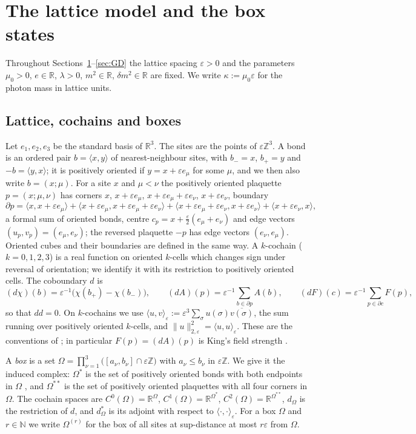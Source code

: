 \documentclass[11pt]{amsart}
\theoremstyle{plain}
\theoremstyle{definition}
\theoremstyle{remark}
\numberwithin{equation}{section}
\newcommand{\R}{\mathbb{R}}
\newcommand{\Z}{\mathbb{Z}}
\newcommand{\N}{\mathbb{N}}
\newcommand{\eps}{\varepsilon}
\newcommand{\norm}[1]{\lVert #1\rVert}
\newcommand{\ip}[2]{\langle #1,#2\rangle}
\newcommand{\ev}[1]{\langle #1\rangle}
\begin{document}
\section{The lattice model and the box states}\label{sec:model}

Throughout Sections~\ref{sec:model}--\ref{sec:GD} the lattice spacing $\eps>0$ and the parameters $\mu_0>0$, $e\in\R$, $\lambda>0$, $m^2\in\R$, $\delta m^2\in\R$ are fixed. We write $\kappa:=\mu_0\eps$ for the photon mass in lattice units.

\subsection{Lattice, cochains and boxes}\label{ssec:lattice}
Let $e_1,e_2,e_3$ be the standard basis of $\R^3$. The sites are the points of $\eps\Z^3$. A bond is an ordered pair $b=\ev{x,y}$ of nearest-neighbour sites, with $b_-=x$, $b_+=y$ and $-b=\ev{y,x}$; it is positively oriented if $y=x+\eps e_\mu$ for some $\mu$, and we then also write $b=(x;\mu)$. For a site $x$ and $\mu<\nu$ the positively oriented plaquette $p=(x;\mu,\nu)$ has corners $x$, $x+\eps e_\mu$, $x+\eps e_\mu+\eps e_\nu$, $x+\eps e_\nu$, boundary
\[
\partial p=\ev{x,x+\eps e_\mu}+\ev{x+\eps e_\mu,x+\eps e_\mu+\eps e_\nu}+\ev{x+\eps e_\mu+\eps e_\nu,x+\eps e_\nu}+\ev{x+\eps e_\nu,x},
\]
a formal sum of oriented bonds, centre $c_p=x+\frac\eps2(e_\mu+e_\nu)$ and edge vectors $(u_p,v_p)=(e_\mu,e_\nu)$; the reversed plaquette $-p$ has edge vectors $(e_\nu,e_\mu)$. Oriented cubes and their boundaries are defined in the same way. A $k$-cochain ($k=0,1,2,3$) is a real function on oriented $k$-cells which changes sign under reversal of orientation; we identify it with its restriction to positively oriented cells. The coboundary $d$ is
\[
(d\chi)(b)=\eps^{-1}\big(\chi(b_+)-\chi(b_-)\big),\qquad (dA)(p)=\eps^{-1}\sum_{b\in\partial p}A(b),\qquad (dF)(c)=\eps^{-1}\sum_{p\in\partial c}F(p),
\]
so that $dd=0$. On $k$-cochains we use $\ip uv_\eps:=\eps^3\sum_\sigma u(\sigma)\overline{v(\sigma)}$, the sum running over positively oriented $k$-cells, and $\norm u_{2,\eps}^2=\ip uu_\eps$. These are the conventions of \cite{K1,K2}; in particular $F(p)=(dA)(p)$ is King's field strength \cite[(2.11)]{K2}.

A \emph{box} is a set $\Omega=\prod_{\nu=1}^3\big([a_\nu,b_\nu]\cap\eps\Z\big)$ with $a_\nu\le b_\nu$ in $\eps\Z$. We give it the induced complex: $\Omega^*$ is the set of positively oriented bonds with both endpoints in $\Omega$ \cite[p.~651]{K1}, and $\Omega^{**}$ is the set of positively oriented plaquettes with all four corners in $\Omega$. The cochain spaces are $C^0(\Omega)=\R^\Omega$, $C^1(\Omega)=\R^{\Omega^*}$, $C^2(\Omega)=\R^{\Omega^{**}}$, $d_\Omega$ is the restriction of $d$, and $d_\Omega^*$ is its adjoint with respect to $\ip\cdot\cdot_\eps$. For a box $\Omega$ and $r\in\N$ we write $\Omega^{(r)}$ for the box of all sites at sup-distance at most $r\eps$ from $\Omega$.
\end{document}

